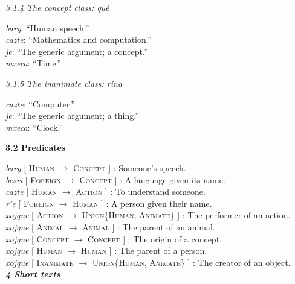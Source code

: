 \documentclass{article}[10pt]
\newcommand{\define}[4]{\emph{#1} [ \textsc{#2} $\rightarrow$ \textsc{#3} ] : #4. \\}
\newcommand{\defarg}[2]{\emph{#1}: ``#2.''\\}
\begin{document}
\emph{3.1.4 The concept class: \emph{qu\'{e}}}
\begin{multicols}{3}
\noindent
\defarg{bary}{Human speech}
\defarg{cazte}{Mathematics and computation}
\defarg{je}{The generic argument; a concept}
\defarg{mxeca}{Time}
\end{multicols}

\emph{3.1.5 The inanimate class: \emph{rina}}
\begin{multicols}{3}
\noindent
\defarg{cazte}{Computer}
\defarg{je}{The generic argument; a thing}
\defarg{mxeca}{Clock}
\end{multicols}

{\bf 3.2 Predicates}

\noindent
\define{bary}{Human}{Concept}{Someone's speech}
\define{besri}{Foreign}{Concept}{A language given its name}
\define{cazte}{Human}{Action}{To understand someone}
\define{r'e}{Foreign}{Human}{A person given their name}
\define{xojque}{Action}{Union\{Human, Animate\}}{The performer of an action}
\define{xojque}{Animal}{Animal}{The parent of an animal}
\define{xojque}{Concept}{Concept}{The origin of a concept}
\define{xojque}{Human}{Human}{The parent of a person}
\define{xojque}{Inanimate}{Union\{Human, Animate\}}{The creator of an object}

\clearpage
{\bf \emph{4 Short texts}}\\
\end{document}
